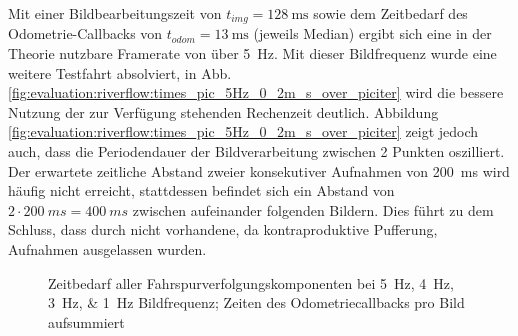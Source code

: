 Mit einer Bildbearbeitungszeit von \(t_{img}=\SI{128}{\milli\second}\) sowie dem Zeitbedarf des Odometrie-Callbacks von \(t_{odom}=\SI{13}{\milli\second}\) (jeweils Median) ergibt sich eine in der Theorie nutzbare Framerate von über \SI{5}{\hertz}. Mit dieser Bildfrequenz wurde eine weitere Testfahrt absolviert, in Abb. \ref{fig:evaluation:riverflow:times_pic_5Hz_0_2m_s_over_piciter} wird die bessere Nutzung der zur Verfügung stehenden Rechenzeit deutlich. Abbildung \ref{fig:evaluation:riverflow:times_pic_5Hz_0_2m_s_over_piciter} zeigt jedoch auch, dass die Periodendauer der Bildverarbeitung zwischen 2 Punkten oszilliert. Der erwartete zeitliche Abstand zweier konsekutiver Aufnahmen von \SI{200}{ms} wird häufig nicht erreicht, stattdessen befindet sich ein Abstand von \(2 \cdot \SI{200}{ms} = \SI{400}{ms}\) zwischen aufeinander folgenden Bildern. Dies führt zu dem Schluss, dass durch nicht vorhandene, da kontraproduktive Pufferung, Aufnahmen ausgelassen wurden.

\begin{figure}[htbp] %
\centering
{}
\hfill
{}
\hfill
{}
\hfill
{}
\caption[Zeitbedarf aller Fahrspurverfolgungskomponenten bei \SIlist{5;4;3;1}{\hertz} Bildfrequenz]{Zeitbedarf aller Fahrspurverfolgungskomponenten bei \SIlist{5;4;3;1}{\hertz} Bildfrequenz; Zeiten des Odometriecallbacks pro Bild aufsummiert}
\end{figure}

